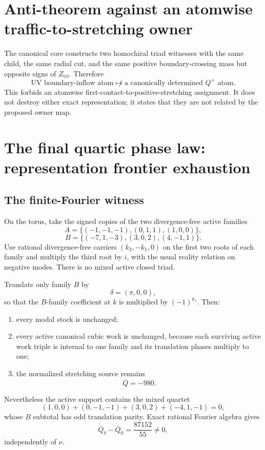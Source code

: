 \documentclass[11pt]{article}
\begin{document}
\section{Anti-theorem against an atomwise traffic-to-stretching owner}

The canonical core constructs two homochiral triad witnesses with the same child, the same radial cut, and the same positive boundary-crossing mass but opposite signs of $Z_{\mathrm{tri}}$.  Therefore
\begin{equation}\label{eq:noatommap}
\boxed{
\text{UV boundary-inflow atom}
\not\longmapsto
\text{a canonically determined }Q^+\text{ atom}.
}
\end{equation}
This forbids an atomwise first-contact-to-positive-stretching assignment.  It does not destroy either exact representation; it states that they are not related by the proposed owner map.

\section{The final quartic phase law: representation frontier exhaustion}

\subsection{The finite-Fourier witness}

On the torus, take the signed copies of the two divergence-free active families
\[
A=\{(-1,-1,-1),(0,1,1),(1,0,0)\},
\]
\[
B=\{(-7,1,-3),(3,0,2),(4,-1,1)\}.
\]
Use rational divergence-free carriers $(k_2,-k_1,0)$ on the first two roots of each family and multiply the third root by $i$, with the usual reality relation on negative modes.  There is no mixed active closed triad.

Translate only family $B$ by
\[
\delta=(\pi,0,0),
\]
so that the $B$-family coefficient at $k$ is multiplied by $(-1)^{k_1}$.  Then:
\begin{enumerate}[label=(\roman*)]
\item every modal stock is unchanged;
\item every active canonical cubic work is unchanged, because each surviving active work triple is internal to one family and its translation phases multiply to one;
\item the normalized stretching source remains
\[
\overline Q=-980.
\]
\end{enumerate}
Nevertheless the active support contains the mixed quartet
\begin{equation}\label{eq:mixedquartet}
(1,0,0)+(0,-1,-1)+(3,0,2)+(-4,1,-1)=0,
\end{equation}
whose $B$ subtotal has odd translation parity.  Exact rational Fourier algebra gives
\begin{equation}\label{eq:QdotWitness}
\boxed{
\dot{\overline Q}_{\delta}
-\dot{\overline Q}_0
=\frac{87152}{55}\ne0,
}
\end{equation}
independently of $\nu$.
\end{document}
